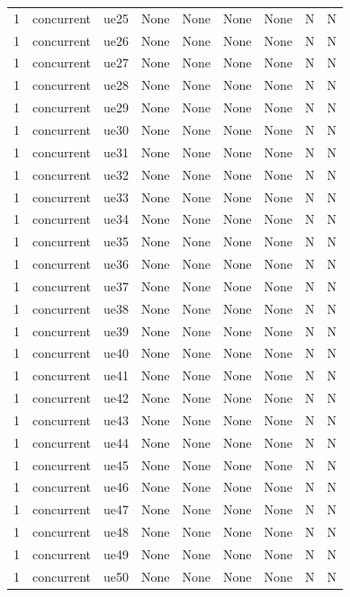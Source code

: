 \begin{table}[ht]
\begin{tabular}{|c|c|c|c|c|c|c|c|c|}
1 & concurrent & ue25 & None & None & None & None & N & N \\
1 & concurrent & ue26 & None & None & None & None & N & N \\
1 & concurrent & ue27 & None & None & None & None & N & N \\
1 & concurrent & ue28 & None & None & None & None & N & N \\
1 & concurrent & ue29 & None & None & None & None & N & N \\
1 & concurrent & ue30 & None & None & None & None & N & N \\
1 & concurrent & ue31 & None & None & None & None & N & N \\
1 & concurrent & ue32 & None & None & None & None & N & N \\
1 & concurrent & ue33 & None & None & None & None & N & N \\
1 & concurrent & ue34 & None & None & None & None & N & N \\
1 & concurrent & ue35 & None & None & None & None & N & N \\
1 & concurrent & ue36 & None & None & None & None & N & N \\
1 & concurrent & ue37 & None & None & None & None & N & N \\
1 & concurrent & ue38 & None & None & None & None & N & N \\
1 & concurrent & ue39 & None & None & None & None & N & N \\
1 & concurrent & ue40 & None & None & None & None & N & N \\
1 & concurrent & ue41 & None & None & None & None & N & N \\
1 & concurrent & ue42 & None & None & None & None & N & N \\
1 & concurrent & ue43 & None & None & None & None & N & N \\
1 & concurrent & ue44 & None & None & None & None & N & N \\
1 & concurrent & ue45 & None & None & None & None & N & N \\
1 & concurrent & ue46 & None & None & None & None & N & N \\
1 & concurrent & ue47 & None & None & None & None & N & N \\
1 & concurrent & ue48 & None & None & None & None & N & N \\
1 & concurrent & ue49 & None & None & None & None & N & N \\
1 & concurrent & ue50 & None & None & None & None & N & N \\

\end{tabular}
\end{table}
